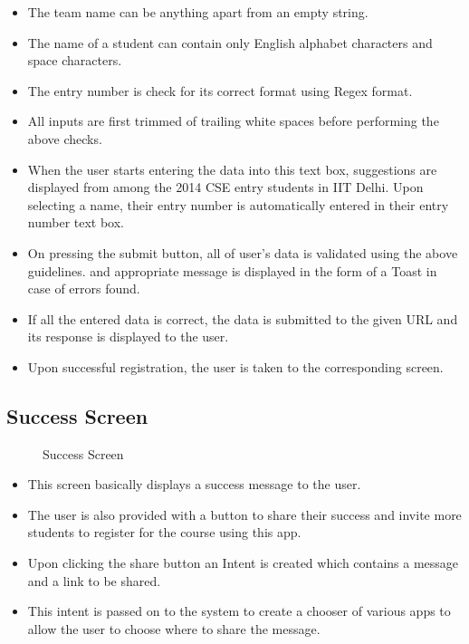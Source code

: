 \documentclass[12pt]{article}
\begin{document}
\begin{itemize}
\setlength\itemsep{-0.4em}
\item The team name can be anything apart from an empty string.
\item The name of a student can contain only English alphabet characters and space characters.
\item The entry number is check for its correct format using Regex format.
\item All inputs are first trimmed of trailing white spaces before performing the above checks.
\end{itemize}

\begin{itemize}
\setlength\itemsep{-0.4em}
\item When the user starts entering the data into this text box, suggestions are displayed from among the 2014 CSE entry students in IIT Delhi. Upon selecting a name, their entry number is automatically entered in their entry number text box.
\item On pressing the submit button, all of user's data is validated using the above guidelines. and appropriate message is displayed in the form of a Toast in case of errors found.
\item If all the entered data is correct, the data is submitted to the given URL and its response is displayed to the user.
\item Upon successful registration, the user is taken to the corresponding screen.
\end{itemize}

\subsection{Success Screen}

\begin{figure}[!ht]
	\centering
	\caption{Success Screen}
\end{figure}

\begin{itemize}
\setlength\itemsep{-0.4em}
\item This screen basically displays a success message to the user.
\item The user is also provided with a button to share their success and invite more students to register for the course using this app.
\end{itemize}

\begin{itemize}
\setlength\itemsep{-0.4em}
\item Upon clicking the share button an Intent is created which contains a message and a link to be shared.
\item This intent is passed on to the system to create a chooser of various apps to allow the user to choose where to share the message.
\end{itemize}
\end{document}

